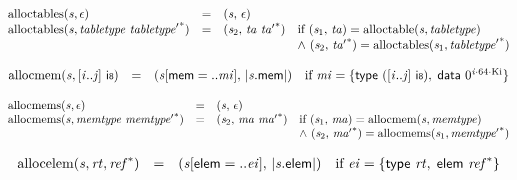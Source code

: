 $$
\begin{array}{@{}lcl@{}l@{}}
{\mathrm{alloctables}}({\mathit{s}}, \epsilon) &=& ({\mathit{s}},\, \epsilon) &  \\
{\mathrm{alloctables}}({\mathit{s}}, {\mathit{tabletype}}~{{\mathit{tabletype}'}^\ast}) &=& ({\mathit{s}}_{{2}},\, {\mathit{ta}}~{{\mathit{ta}'}^\ast}) &\quad
  \mbox{if}~({\mathit{s}}_{{1}},\, {\mathit{ta}}) = {\mathrm{alloctable}}({\mathit{s}}, {\mathit{tabletype}}) \\
 &&&\quad {\land}~({\mathit{s}}_{{2}},\, {{\mathit{ta}'}^\ast}) = {\mathrm{alloctables}}({\mathit{s}}_{{1}}, {{\mathit{tabletype}'}^\ast}) \\
\end{array}
$$

$$
\begin{array}{@{}lcl@{}l@{}}
{\mathrm{allocmem}}({\mathit{s}}, {}[{\mathit{i}} .. {\mathit{j}}]~\mathsf{i{\scriptstyle8}}) &=& ({\mathit{s}}{}[\mathsf{mem} = ..{\mathit{mi}}],\, {|{\mathit{s}}.\mathsf{mem}|}) &\quad
  \mbox{if}~{\mathit{mi}} = \{ \begin{array}[t]{@{}l@{}}
\mathsf{type}~({}[{\mathit{i}} .. {\mathit{j}}]~\mathsf{i{\scriptstyle8}}),\; \mathsf{data}~{0^{{\mathit{i}} \cdot 64 \cdot {\mathrm{Ki}}}} \}\end{array} \\
\end{array}
$$

$$
\begin{array}{@{}lcl@{}l@{}}
{\mathrm{allocmems}}({\mathit{s}}, \epsilon) &=& ({\mathit{s}},\, \epsilon) &  \\
{\mathrm{allocmems}}({\mathit{s}}, {\mathit{memtype}}~{{\mathit{memtype}'}^\ast}) &=& ({\mathit{s}}_{{2}},\, {\mathit{ma}}~{{\mathit{ma}'}^\ast}) &\quad
  \mbox{if}~({\mathit{s}}_{{1}},\, {\mathit{ma}}) = {\mathrm{allocmem}}({\mathit{s}}, {\mathit{memtype}}) \\
 &&&\quad {\land}~({\mathit{s}}_{{2}},\, {{\mathit{ma}'}^\ast}) = {\mathrm{allocmems}}({\mathit{s}}_{{1}}, {{\mathit{memtype}'}^\ast}) \\
\end{array}
$$

$$
\begin{array}{@{}lcl@{}l@{}}
{\mathrm{allocelem}}({\mathit{s}}, {\mathit{rt}}, {{\mathit{ref}}^\ast}) &=& ({\mathit{s}}{}[\mathsf{elem} = ..{\mathit{ei}}],\, {|{\mathit{s}}.\mathsf{elem}|}) &\quad
  \mbox{if}~{\mathit{ei}} = \{ \begin{array}[t]{@{}l@{}}
\mathsf{type}~{\mathit{rt}},\; \mathsf{elem}~{{\mathit{ref}}^\ast} \}\end{array} \\
\end{array}
$$

